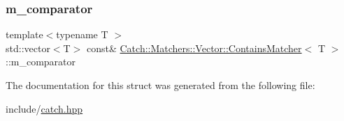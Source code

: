 \subsubsection{\texorpdfstring{m\+\_\+comparator}{m\_comparator}}
{\footnotesize\ttfamily template$<$typename T $>$ \\
std\+::vector$<$T$>$ const\& \mbox{\hyperlink{struct_catch_1_1_matchers_1_1_vector_1_1_contains_matcher}{Catch\+::\+Matchers\+::\+Vector\+::\+Contains\+Matcher}}$<$ T $>$\+::m\+\_\+comparator}



The documentation for this struct was generated from the following file\+:\begin{DoxyCompactItemize}
\item 
include/\mbox{\hyperlink{catch_8hpp}{catch.\+hpp}}\end{DoxyCompactItemize}
